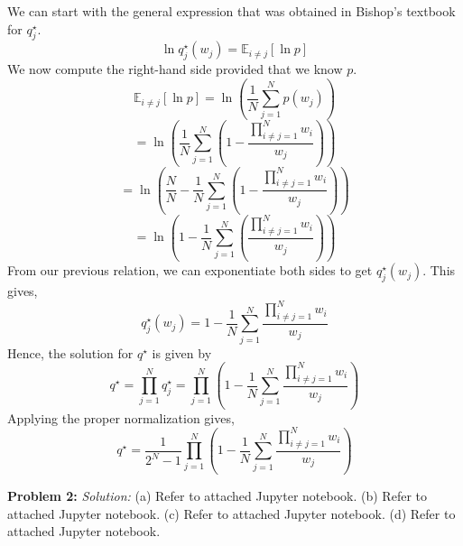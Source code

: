 \documentclass[12pt]{article}
\begin{document}
We can start with the general expression that was obtained in Bishop's textbook for $q_{j}^{\star}$. 
$$\ln q_{j}^{\star}  (w_{j} ) = \mathbb{E}_{ i\neq j} [\ln p  ]   $$
We  now compute the right-hand side provided that we know $p$.  
$$ \mathbb{E}_{ i\neq j} [\ln p  ]  =  \ln  (\frac{1 }{ N} \sum_{j=1 }^{N} p(w_j)     )  $$
$$ = \ln  (\frac{1 }{ N} \sum_{j=1 }^{N} (1 - \frac{ \prod_{ i\neq j = 1}^{N} w_{i}    }{ w_{j} }   )    ) $$
$$ = \ln  ( \frac{N }{N } -  \frac{1 }{ N} \sum_{j=1 }^{N}  (1 - \frac{ \prod_{ i\neq j = 1}^{N} w_{i}    }{ w_{j} }   )    ) $$
$$ =  \ln  ( 1 -  \frac{1 }{ N} \sum_{j=1 }^{N}  ( \frac{ \prod_{ i\neq j = 1}^{N} w_{i}    }{ w_{j} }   )    ) $$
From our previous relation, we can exponentiate both sides to get $q_{j}^{\star}  (w_{j} )$. This gives,
$$q_{j}^{\star}  (w_{j} ) = 1 -  \frac{1 }{ N} \sum_{j=1 }^{N}   \frac{ \prod_{ i\neq j = 1}^{N} w_{i}    }{ w_{j} }       $$
Hence, the solution for $q^{\star}$ is given by
$$ q^{\star} = \prod_{j=1}^{N} q_{j}^{\star}  = \prod_{j=1}^{N}   (1 -  \frac{1 }{ N} \sum_{j=1 }^{N}   \frac{ \prod_{ i\neq j = 1}^{N} w_{i}    }{ w_{j} })  $$
Applying the proper normalization gives,
$$  q^{\star} = \frac{ 1}{2^{N} -1 } \prod_{j=1}^{N}   (1 -  \frac{1 }{ N} \sum_{j=1 }^{N}   \frac{ \prod_{ i\neq j = 1}^{N} w_{i}    }{ w_{j} } ) $$

\textbf{Problem 2:}  \newline 
\emph{Solution:} \newline \newline 
(a) Refer to attached Jupyter notebook. \newline 
(b) Refer to attached Jupyter notebook.   \newline 
(c) Refer to attached Jupyter notebook. \newline 
(d) Refer to attached Jupyter notebook.   \newline 
\end{document}

